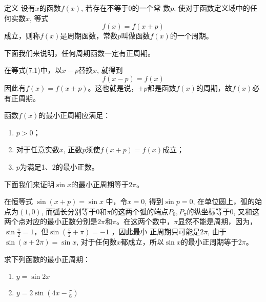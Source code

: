 \begin{blk}{定义}
    设有$x$的函数$f(x)$, 若存在不等于0的一个常
数$p$, 使对于函数定义域中的任何实数$x$, 等式
\begin{equation}
    f (x) =f (x+p) 
\end{equation}
成立，则称$f(x)$是周期函数，常数$p$叫做函数$f(x)$的一个周期。
\end{blk}

下面我们来说明，任何周期函数一定有正周期。

在等式(7.1)中，以$x-p$替换$x$, 就得到
\[f (x-p) =f (x)\]
因此有$f (x) =f (x\pm p)$。这也就是说，$\pm p$都是函数$f(x)$的周期，故$f(x)$必有正周期。

函数$f(x)$的最小正周期应满足：
\begin{enumerate}
    \item $p>0$；
    \item 对于任意实数$x$, 正数$p$须使$f(x+p)=f(x)$成立；
    \item $p$为满足1、2的最小正数。
\end{enumerate}

下面我们来证明$\sin x$的最小正周期等于$2\pi$。

在恒等式 $\sin(x+p)=\sin x$ 中，令$x=0$, 得到$\sin p=0$,
在单位圆上，弧的始点为$(1, 0)$, 而弧长分别等于0和$\pi$的这两个弧的端点$P_0,P_{\pi}$的纵坐标等于0, 又和这两个点对应的最小正数分别是$2\pi$和$\pi$。在这两个数中，$\pi$显然不能是周期，因为，$\sin\frac{\pi}{2}=1$，但$\sin\left(\frac{\pi}{2}+\pi\right)=-1$
，因此最小
正周期只可能是$2\pi$, 由于$\sin(x+2\pi)=\sin x$, 对于任何数$x$都成立，所以$\sin x$的最小正周期等于$2\pi$。

\begin{example}
    求下列函数的最小正周期：
\begin{multicols}{2}
\begin{enumerate}
    \item $y=\sin2x $ 
    \item $y=2\sin\left(4x-\frac{\pi}{6}\right)$
\end{enumerate}
\end{multicols}
\end{example}

